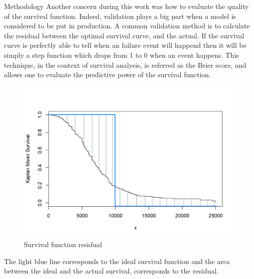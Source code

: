 \documentclass[t]{beamer}
\begin{document}
\begin{frame}[label={sec:orgc2b2963}]{}
\begin{columns}
\begin{column}{0.3\columnwidth}
\begin{block}{Methodology}
Another concern during this work was how to evaluate the quality of the survival function. Indeed,
validation plays a big part when a model is considered to be put in production. A common validation method
is to calculate the residual between the optimal survival curve, and
the actual. If the survival curve is perfectly able to tell when an failure event will happend
then it will be simply a step function which drops from 1 to 0 when an event happens. This technique, in
the context of survival analysis, is referred as the Brier score, and allows one to evaluate the predictive 
power of the survival function.
\begin{figure}[htbp]
\centering
\includegraphics[width=.9\linewidth]{./Logos/survival2.png}
\caption{\label{fig:orgf7bccbc}
Survival function residual}
\end{figure}
  The light blue line corresponds to the ideal survival function and the area between the ideal and
  the actual survival, corresponds to the residual.
\end{block}


\end{column}
\end{columns}
\end{frame}
\end{document}
